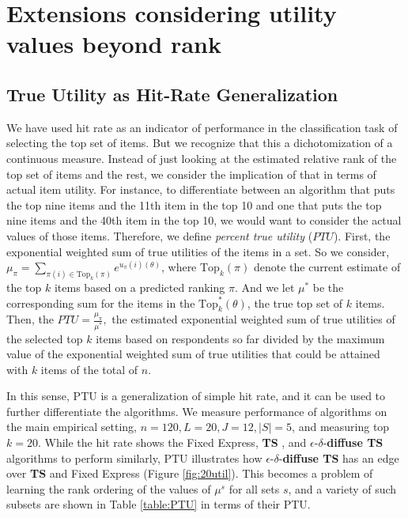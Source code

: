 \documentclass[nonblindrev]{informs3}
\newcommand{\ts}{\textbf{TS} }
\newcommand{\edts}{$\epsilon$-$\delta$-\textbf{diffuse TS} }
\newcommand{\numitems}{n}
\newcommand{\numperset}{L}
\newcommand{\topset}{\text{Top}_k}
\begin{document}
\section{Extensions considering utility values beyond rank}


\subsection{True Utility as Hit-Rate Generalization}

We have used hit rate as an indicator of performance in the classification task of selecting the top set of items. But we recognize that this a dichotomization of a continuous measure. Instead of just looking at the estimated relative rank of the top set of items and the rest, we consider the implication of that in terms of actual item utility. For instance, to differentiate between an algorithm that puts the top nine items and the 11th item in the top 10 and one that puts the top nine items and the 40th item in the top 10, we would want to consider the actual values of those items. Therefore, we define \emph{percent true utility} ($PTU$). First, the exponential weighted sum of true utilities of the items in a set. So we consider, $\mu_\pi=\sum_{\pi(i) \in \topset(\pi)} e^{u_\pi(i)(\theta)}$, where $\topset(\pi)$ denote the current estimate of the top $k$ items based on a predicted ranking $\pi$. And we let $\mu^{*}$ be the corresponding sum for the items in the $\topset^{*}(\theta)$, the true top set of $k$ items. Then, the $PTU = \frac{\mu_\pi}{\mu^{*}},$ the estimated exponential weighted sum of true utilities of the selected top $k$ items based on respondents so far divided by the maximum value of the exponential weighted sum of true utilities that could be attained with $k$ items of the total of $\numitems$. 

In this sense, PTU is a generalization of simple hit rate, and it can be used to further differentiate the algorithms. We measure performance of algorithms on the main empirical setting, $\numitems=120,\numperset=20,J=12,|S|=5$, and measuring top $k=20$. While the hit rate shows the Fixed Express, \ts, and \edts algorithms to perform similarly, PTU illustrates how \edts has an edge over \ts and Fixed Express (Figure \ref{fig:20util}).  This becomes a problem of learning the rank ordering of the values of $\mu^s$ for all sets $s$, and a variety of such subsets are shown in Table \ref{table:PTU} in terms of their PTU.
\end{document}
